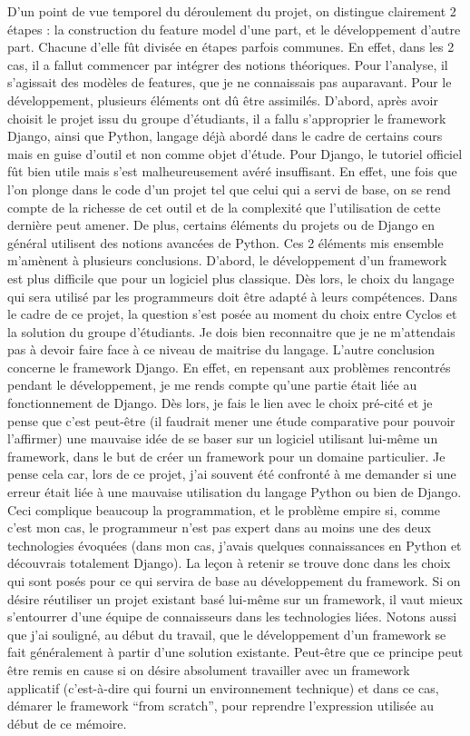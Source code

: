 D'un point de vue temporel du déroulement du projet,  on distingue clairement 2 étapes : la construction du feature model d'une part,  et le développement d'autre part.  Chacune d'elle fût divisée en étapes parfois communes.  En effet,  dans les 2 cas,  il a fallut commencer par intégrer des notions théoriques.  Pour l'analyse,  il s'agissait des modèles de features,  que je ne connaissais pas auparavant.  Pour le développement,  plusieurs éléments ont dû être assimilés.  D'abord,  après avoir choisit le projet issu du groupe d'étudiants,  il a fallu s'approprier le framework Django,  ainsi que Python,  langage déjà abordé dans le cadre de certains cours mais en guise d'outil et non comme objet d'étude.  Pour Django,  le tutoriel officiel fût bien utile mais s'est malheureusement avéré insuffisant.  En effet,  une fois que l'on plonge dans le code d'un projet tel que celui qui a servi de base,  on se rend compte de la richesse de cet outil et de la complexité que l'utilisation de cette dernière peut amener.  De plus,  certains éléments du projets ou de Django en général utilisent des notions avancées de Python.  Ces 2 éléments mis ensemble m'amènent à plusieurs conclusions.  D'abord,  le développement d'un framework est plus difficile que pour un logiciel plus classique.  Dès lors,  le choix du langage qui sera utilisé par les programmeurs doit être adapté à leurs compétences.  Dans le cadre de ce projet,  la question s'est posée au moment du choix entre Cyclos et la solution du groupe d'étudiants.  Je dois bien reconnaitre que je ne m'attendais pas à devoir faire face à ce niveau de maitrise du langage.  L'autre conclusion concerne le framework Django.   En effet,  en repensant aux problèmes rencontrés pendant le développement,  je me rends compte qu'une partie était liée au fonctionnement de Django.  Dès lors,  je fais le lien avec le choix pré-cité et je pense que c'est peut-être (il faudrait mener une étude comparative pour pouvoir l'affirmer) une mauvaise idée de se baser sur un logiciel utilisant lui-même un framework,  dans le but de créer un framework pour un domaine particulier.  Je pense cela car,  lors de ce projet,  j'ai souvent été confronté à me demander si une erreur était liée à une mauvaise utilisation du langage Python ou bien de Django.  Ceci complique beaucoup la programmation,  et le problème empire si,  comme c'est mon cas,  le programmeur n'est pas expert dans au moins une des deux technologies évoquées (dans mon cas,  j'avais quelques connaissances en Python et découvrais totalement Django).  La leçon à retenir se trouve donc dans les choix qui sont posés pour ce qui servira de base au développement du framework.  Si on désire réutiliser un projet existant basé lui-même sur un framework,  il vaut mieux s'entourrer d'une équipe de connaisseurs dans les technologies liées.  Notons aussi que j'ai souligné,  au début du travail,  que le développement d'un framework se fait généralement à partir d'une solution existante.  Peut-être que ce principe peut être remis en cause si on désire absolument travailler avec un framework applicatif (c'est-à-dire qui fourni un environnement technique) et dans ce cas,  démarer le framework ``from scratch'',  pour reprendre l'expression utilisée au début de ce mémoire.

